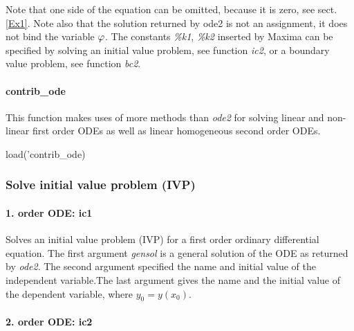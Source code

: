 \documentclass[../Maxima_Workbook.tex]{subfiles}
\begin{document}
Note that one side of the equation can be omitted, because it is zero, see sect. \ref{Ex1}. Note also that the solution returned by ode2 is not an assignment, it does not bind the variable $ \varphi $. The constants \emph{\%k1}, \emph{\%k2} inserted by Maxima can be specified by solving an initial value problem, see function \emph{ic2}, or a boundary value problem, see function \emph{bc2}.

\paragraph{\texorpdfstring{contrib\_ode}{contrib_ode}} \mbox{}

\lzz {} \hfill {}

\lz This function makes uses of more methods than \emph{ode2} for solving linear and non-linear first order ODEs as well as linear homogeneous second order ODEs.

\lz load('contrib\_ode)

\subsubsection{Solve initial value problem (IVP)}

\paragraph{1. order ODE: ic1} \mbox{}

\lzz {} \hfill \tcr{[function]}

\lz Solves an initial value problem (IVP) for a first order ordinary differential equation. The first argument \emph{gensol} is a general solution of the ODE as returned by \emph{ode2}. The second argument specified the name and initial value of the independent variable.\footnotemark The last argument gives the name and the initial value of the dependent variable, where $ y_0=y(x_0) $. 

\paragraph{2. order ODE: ic2}\label{DE1} \mbox{}

\lzz {} \hfill \tcr{[function]}
\end{document}

